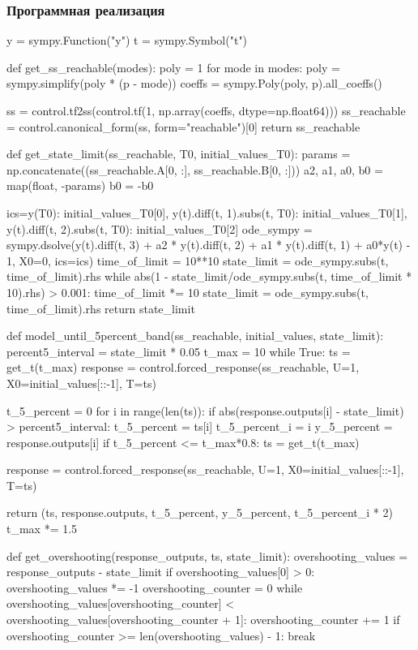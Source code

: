 \documentclass[16pt]{article}
\begin{document}
\subsubsection{Программная реализация}
\begin{python}
    y = sympy.Function("y")
t = sympy.Symbol("t")

def get_ss_reachable(modes):
    poly = 1
    for mode in modes:
        poly = sympy.simplify(poly * (p - mode))
    coeffs = sympy.Poly(poly, p).all_coeffs()
    
    ss = control.tf2ss(control.tf(1, np.array(coeffs, dtype=np.float64)))
    ss_reachable = control.canonical_form(ss, form="reachable")[0]
    return ss_reachable


def get_state_limit(ss_reachable, T0, initial_values_T0):
    params = np.concatenate((ss_reachable.A[0, :], ss_reachable.B[0, :]))
    a2, a1, a0, b0 = map(float, -params)
    b0 = -b0
    
    ics={y(T0): initial_values_T0[0], y(t).diff(t, 1).subs(t, T0): initial_values_T0[1], y(t).diff(t, 2).subs(t, T0): initial_values_T0[2]}
    ode_sympy = sympy.dsolve(y(t).diff(t, 3) + a2 * y(t).diff(t, 2) + a1 * y(t).diff(t, 1) + a0*y(t) - 1, X0=0, ics=ics)
    time_of_limit = 10**10
    state_limit = ode_sympy.subs(t, time_of_limit).rhs
    while abs(1 - state_limit/ode_sympy.subs(t, time_of_limit * 10).rhs) > 0.001:
        time_of_limit *= 10
        state_limit = ode_sympy.subs(t, time_of_limit).rhs
    return state_limit

def model_until_5percent_band(ss_reachable, initial_values, state_limit):
    percent5_interval = state_limit * 0.05
    t_max = 10
    while True:
        ts = get_t(t_max)
        response = control.forced_response(ss_reachable, U=1, X0=initial_values[::-1], T=ts)

        t_5_percent = 0
        for i in range(len(ts)):
            if abs(response.outputs[i] - state_limit) > percent5_interval:
                t_5_percent = ts[i]
                t_5_percent_i = i
                y_5_percent = response.outputs[i]
        if t_5_percent <= t_max*0.8:
            ts = get_t(t_max)

            response = control.forced_response(ss_reachable, U=1, X0=initial_values[::-1], T=ts)
            
            return (ts, response.outputs, t_5_percent, y_5_percent, t_5_percent_i * 2)
        t_max *= 1.5
    
def get_overshooting(response_outputs, ts, state_limit):
    overshooting_values = response_outputs - state_limit
    if overshooting_values[0] > 0:
        overshooting_values *= -1
    overshooting_counter = 0
    while overshooting_values[overshooting_counter] < overshooting_values[overshooting_counter + 1]:
        overshooting_counter += 1
        if overshooting_counter >= len(overshooting_values) - 1:
            break
    

\end{python}
\end{document}
